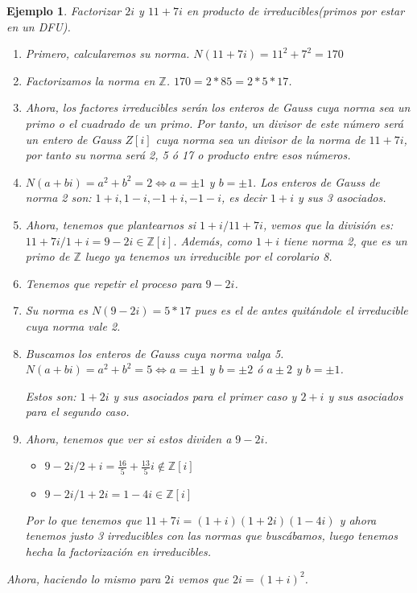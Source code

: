 \documentclass[11pt, a4paper, titlepage]{article}
\providecommand{\ent}{\mathbb{Z}}
\theoremstyle{theorem-style}
\theoremstyle{definition-style}
\theoremstyle{remark-style}
\theoremstyle{example-style}
\newtheorem*{ejemplo}{Ejemplo}
\begin{document}
\begin{ejemplo}
	Factorizar $2i$ y $11+7i$ en producto de irreducibles(primos por estar en un DFU).
	
	\begin{enumerate}
	\item Primero, calcularemos su norma. $N(11+7i) = 11^2 + 7^2 = 170$
	\item Factorizamos la norma en $\ent$. $170 = 2*85 = 2*5 *17$.
	\item Ahora, los factores irreducibles serán los enteros de Gauss cuya norma sea un primo o el cuadrado de un primo. Por tanto, un divisor de este número será un entero de Gauss $Z[i]$ cuya norma sea un divisor de la norma de $11+7i$, por tanto su norma será 2, 5 ó 17 o producto entre esos números.
	\item  $N(a+bi) = a^2 +b^2 = 2 \iff a=\pm 1$ y $b= \pm 1.$ Los enteros de Gauss de norma 2 son: $1+i,1-i,-1+i,-1-i$, es decir $1+i$ y sus 3 asociados.
	\item Ahora, tenemos que plantearnos si $1+i / 11+7i$, vemos que la división es: $11+7i/1+i = 9-2i\in \ent[i]$. Además, como $1+i$ tiene norma 2, que es un primo de $\ent$ luego ya tenemos un irreducible por el corolario 8. 
	\item Tenemos que repetir el proceso para $9-2i$.
	\item Su norma es $N(9-2i) = 5*17$ pues es el de antes quitándole el irreducible cuya norma vale 2.
	\item Buscamos los enteros de Gauss cuya norma valga 5. $N(a+bi) = a^2 +b^2 = 5 \iff a = \pm 1$ y $b =\pm 2$ ó $a \pm 2$ y $b = \pm 1$.
	
	Estos son: $1+2i$ y sus asociados para el primer caso y $2+i$ y sus asociados para el segundo caso.
	
	\item Ahora, tenemos que ver si estos dividen a $9-2i$. 
	\begin{itemize}
	\item $9-2i/2+i  = \frac{16}{5} + \frac{13}{5}i \notin \ent[i]$
	\item $9-2i /1+2i = 1-4i \in \ent[i]$
\end{itemize}

Por lo que tenemos que $11+7i = (1+i)(1+2i)(1-4i)$ y ahora tenemos justo 3 irreducibles con las normas que buscábamos, luego tenemos hecha la factorización en irreducibles.
	
\end{enumerate}

Ahora, haciendo lo mismo para $2i$ vemos que $2i = (1+i)^2$.

	
\end{ejemplo}
\end{document}
